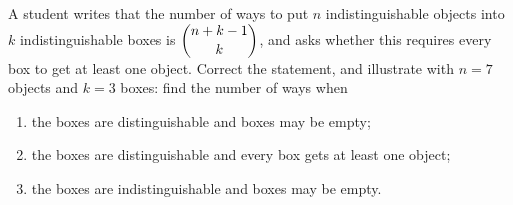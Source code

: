 A student writes that the number of ways to put $n$ indistinguishable objects into $k$ indistinguishable boxes is $\dbinom{n+k-1}{k}$, and asks whether this requires every box to get at least one object. Correct the statement, and illustrate with $n=7$ objects and $k=3$ boxes: find the number of ways when
\begin{enumerate}
\item the boxes are distinguishable and boxes may be empty;
\item the boxes are distinguishable and every box gets at least one object;
\item the boxes are indistinguishable and boxes may be empty.
\end{enumerate}
